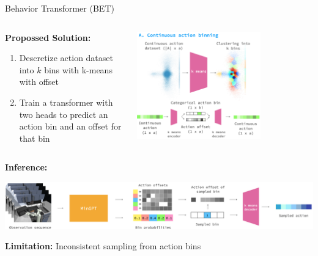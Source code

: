 \documentclass{beamer}
\begin{document}
\begin{frame}[t]{Behavior Transformer (BET)}
	\begin{columns}
        \hspace{1em}
		\begin{column}{0.4\textwidth}
            \textbf{Propossed Solution:}
            \begin{enumerate}[label=\arabic*.]
                \item Descretize action dataset into $k$ bins with k-means with offset
                \item Train a transformer with two heads to predict an action bin and an offset for that bin
            \end{enumerate}
		\end{column}
		\begin{column}{0.6\textwidth}
            \begin{center}
                \includegraphics[width=0.7\textwidth]{./img/bet_action.png}
            \end{center}
		\end{column}
	\end{columns}
    \pause
    \vspace{-0.5em}
    \textbf{Inference:}
    \begin{center}
        \includegraphics[width=\textwidth]{./img/bet_inference.png}
    \end{center}
    \pause
    \vspace{-0.5em}
    \textbf{Limitation:} Inconsistent sampling from action bins
\end{frame}
\end{document}
